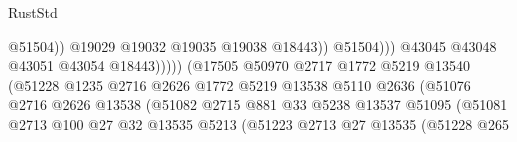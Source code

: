 \begin{lexlean}{RustStd}
\begin{coremodule}
                                                            @51504))
                                                        @19029
                                                        @19032
                                                        @19035
                                                        @19038
                                                        @18443))
                                                    @51504)))
                                              @43045
                                              @43048
                                              @43051
                                              @43054
                                              @18443)))))
                                    (@17505
                                      @50970
                                      @2717
                                      @1772
                                      @5219
                                      @13540
                                      (@51228
                                        @1235
                                        @2716
                                        @2626
                                        @1772
                                        @5219
                                        @13538
                                        @5110
                                        @2636
                                        (@51076
                                          @2716
                                          @2626
                                          @13538
                                          (@51082
                                            @2715
                                            @881
                                            @33
                                            @5238
                                            @13537
                                            @51095
                                            (@51081
                                              @2713
                                              @100
                                              @27
                                              @32
                                              @13535
                                              @5213
                                              (@51223
                                                @2713
                                                @27
                                                @13535
                                                (@51228
                                                  @265

\end{coremodule}
\end{lexlean}

